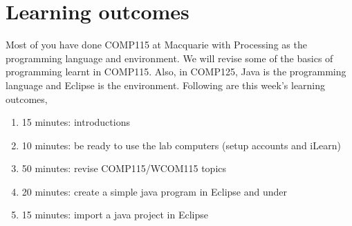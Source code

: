  
\section*{Learning outcomes}
Most of you have done COMP115 at Macquarie with Processing as the programming language and environment. We will revise some of the basics of programming learnt in COMP115. Also, in COMP125, Java is the programming language and Eclipse is the environment. Following are this week's learning outcomes,
\begin{enumerate}
\item 15 minutes: introductions
\item 10 minutes: be ready to use the lab computers (setup accounts and iLearn)
\item 50 minutes: revise COMP115/WCOM115 topics
\item 20 minutes: create a simple java program in Eclipse and under
\item 15 minutes: import a java project in Eclipse
\end{enumerate}

